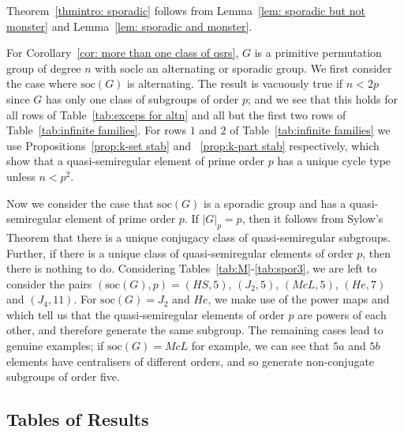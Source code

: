 \documentclass{article}
\theoremstyle{remark}
\theoremstyle{definition}
\newcommand{\soc}{\mathrm{soc}}
\newcommand{\qsr}{quasi-semiregular}
\newcommand{\qsre}{quasi-semiregular element}
\newcommand{\qsres}{quasi-semiregular elements}
\begin{document}
Theorem~\ref{thmintro: sporadic} follows from Lemma~\ref{lem: sporadic but not monster} and Lemma~\ref{lem: sporadic and monster}.

\medskip
For Corollary~\ref{cor: more than one class of qsrs}, $G$ is a primitive permutation group of degree $n$ with socle an alternating or sporadic group. We first consider the case where $\soc(G)$ is alternating. The result is vacuously true if $n<2p$ since $G$ has only one class of subgroups of order $p$; and we see that this holds for all rows of Table~\ref{tab:exceps for altn} and all but the first two rows of   Table~\ref{tab:infinite families}. For  rows $1$ and $2$ of Table~\ref{tab:infinite families} we use Propositions~\ref{prop:k-set stab} and ~\ref{prop:k-part stab} respectively, which show that a {\qsre} of prime order $p$ has a unique cycle type unless $n<p^2$.

Now we consider the case that $\soc(G)$ is a sporadic group and has a {\qsre} of prime order $p$.  If $|G|_p=p$, then it follows from Sylow's Theorem that there is a unique conjugacy class of {\qsr} subgroups. Further, if there is a unique class of {\qsres} of order $p$, then there is nothing to do. Considering Tables~\ref{tab:M}-\ref{tab:spor3}, we are left to consider the pairs $(\soc(G),p)=(HS,5)$, $(J_2,5)$, $(McL,5)$, $(He,7)$ and $(J_4,11)$. For $\soc(G)=J_2$ and $He$, we make use of the power maps \cite{ATLAS} and \cite{OnlineAtlas} which tell us that the {\qsres} of order $p$ are powers of each other, and therefore generate the same subgroup. The remaining cases lead to genuine examples; if $\soc(G)=McL$ for example, we can see that $5a$ and $5b$ elements have centralisers of different orders, and so generate non-conjugate subgroups of order five.



\subsection{Tables of Results}
\label{sec:tables}
\end{document}

